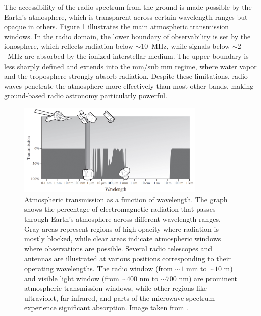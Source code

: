 The accessibility of the radio spectrum from the ground is made possible by the Earth’s atmosphere, which is transparent across certain wavelength ranges but opaque in others. Figure \ref{fig:atmospheric_windows} illustrates the main atmospheric transmission windows. In the radio domain, the lower boundary of observability is set by the ionosphere, which reflects radiation below $\sim10$~MHz, while signals below $\sim2$~MHz are absorbed by the ionized interstellar medium. The upper boundary is less sharply defined and extends into the mm/sub mm regime, where water vapor and the troposphere strongly absorb radiation. Despite these limitations, radio waves penetrate the atmosphere more effectively than most other bands, making ground-based radio astronomy particularly powerful.
\begin{figure}[h!]
	\centering
	\includegraphics[width=0.8\textwidth]{../figures/atmospheric_transmission.png}
	\caption[Atmospheric transmission]{Atmospheric transmission as a function of wavelength. The graph shows the percentage of electromagnetic radiation that passes through Earth's atmosphere across different wavelength ranges. Gray areas represent regions of high opacity where radiation is mostly blocked, while clear areas indicate atmospheric windows where observations are possible. Several radio telescopes and antennas are illustrated at various positions corresponding to their operating wavelengths. The radio window (from $\sim1$ mm to $\sim10$ m) and visible light window (from $\sim400$ nm to $\sim700$ nm) are prominent atmospheric transmission windows, while other regions like ultraviolet, far infrared, and parts of the microwave spectrum experience significant absorption. Image taken from \citet{essential_radio_astronomy}.}
	\label{fig:atmospheric_windows}
\end{figure}

